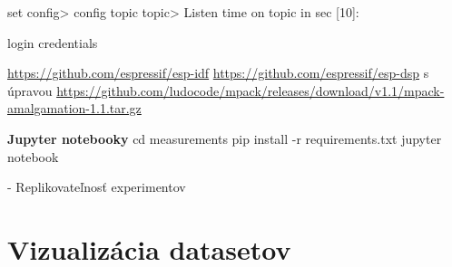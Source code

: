 	set
		config>
	config
	topic
		topic>
		Listen time on topic in sec [10]:
	
	login
	credentials
	
\url{https://github.com/espressif/esp-idf}
\url{https://github.com/espressif/esp-dsp} s úpravou
\url{https://github.com/ludocode/mpack/releases/download/v1.1/mpack-amalgamation-1.1.tar.gz}

\textbf{Jupyter notebooky}
cd measurements
pip install -r requirements.txt
jupyter notebook

- Replikovateľnosť experimentov

	
\thispagestyle{empty}

\chapter{Vizualizácia datasetov}
\renewcommand*{\thepage}{D-\arabic{page}}
